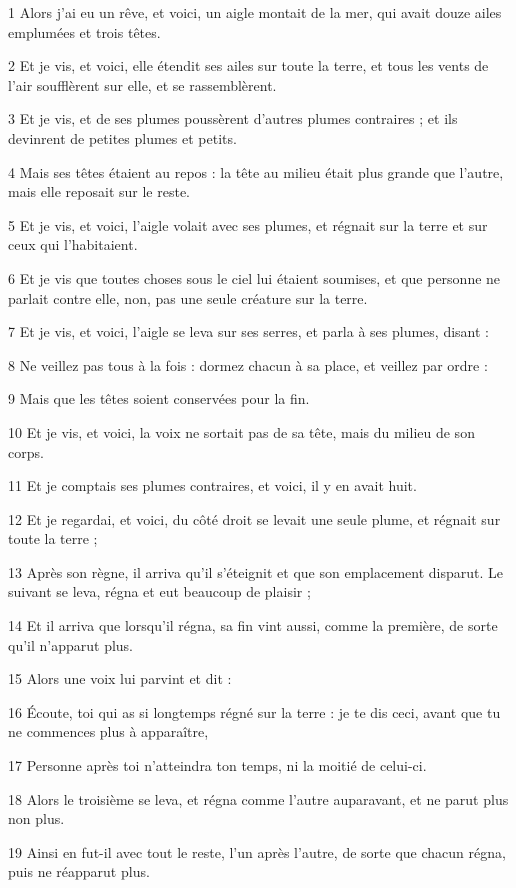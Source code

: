 \par 1 Alors j'ai eu un rêve, et voici, un aigle montait de la mer, qui avait douze ailes emplumées et trois têtes.
\par 2 Et je vis, et voici, elle étendit ses ailes sur toute la terre, et tous les vents de l'air soufflèrent sur elle, et se rassemblèrent.
\par 3 Et je vis, et de ses plumes poussèrent d'autres plumes contraires ; et ils devinrent de petites plumes et petits.
\par 4 Mais ses têtes étaient au repos : la tête au milieu était plus grande que l'autre, mais elle reposait sur le reste.
\par 5 Et je vis, et voici, l'aigle volait avec ses plumes, et régnait sur la terre et sur ceux qui l'habitaient.
\par 6 Et je vis que toutes choses sous le ciel lui étaient soumises, et que personne ne parlait contre elle, non, pas une seule créature sur la terre.
\par 7 Et je vis, et voici, l'aigle se leva sur ses serres, et parla à ses plumes, disant :
\par 8 Ne veillez pas tous à la fois : dormez chacun à sa place, et veillez par ordre :
\par 9 Mais que les têtes soient conservées pour la fin.
\par 10 Et je vis, et voici, la voix ne sortait pas de sa tête, mais du milieu de son corps.
\par 11 Et je comptais ses plumes contraires, et voici, il y en avait huit.
\par 12 Et je regardai, et voici, du côté droit se levait une seule plume, et régnait sur toute la terre ;
\par 13 Après son règne, il arriva qu'il s'éteignit et que son emplacement disparut. Le suivant se leva, régna et eut beaucoup de plaisir ;
\par 14 Et il arriva que lorsqu'il régna, sa fin vint aussi, comme la première, de sorte qu'il n'apparut plus.
\par 15 Alors une voix lui parvint et dit :
\par 16 Écoute, toi qui as si longtemps régné sur la terre : je te dis ceci, avant que tu ne commences plus à apparaître,
\par 17 Personne après toi n'atteindra ton temps, ni la moitié de celui-ci.
\par 18 Alors le troisième se leva, et régna comme l'autre auparavant, et ne parut plus non plus.
\par 19 Ainsi en fut-il avec tout le reste, l'un après l'autre, de sorte que chacun régna, puis ne réapparut plus.
